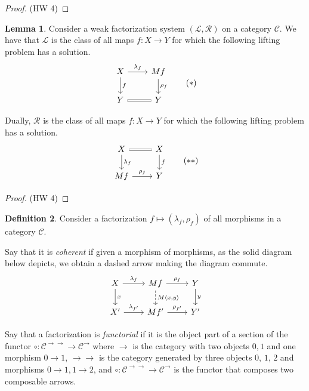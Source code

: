\documentclass{article}
\theoremstyle{definition}
\newtheorem{definition}{Definition}[section]
\newtheorem{lemma}[definition]{Lemma}
\newcommand{\C}{\mathcal C}
\begin{document}
\begin{proof}
    (HW 4)
\end{proof}

\begin{lemma}
    \label{lem:factorization}
    Consider a weak factorization system $(\mathcal L, \mathcal R)$ on a category $\C$. We have that $\mathcal L$ is the class of all maps $f: X \to Y$ for which the following lifting problem has a solution.
    \[
         \begin{tikzcd}
             X \ar[r,"\lambda_f"] \ar[d,"f"] & Mf \ar[d,"\rho_f"]
             \\ 
             Y \ar[r,equal] & Y
         \end{tikzcd}
         \tag{$*$}
    \]

    Dually, $\mathcal R$ is the class of all maps $f: X \to Y$ for which the following lifting problem has a solution.
    \[
         \begin{tikzcd}
             X \ar[r,equal] \ar[d,"\lambda_f"] & X \ar[d,"f"]
             \\ 
             Mf \ar[r,"\rho_f"] & Y
         \end{tikzcd}
         \tag{$**$}
    \]
\end{lemma}
\begin{proof}
    (HW 4)
\end{proof}

\begin{definition}
    Consider a factorization $f \mapsto (\lambda_f, \rho_f)$ of all morphisms in a category $\C$.
    
    Say that it is \emph{coherent} if given a morphism of morphisms, as the solid diagram below depicts, we obtain a dashed arrow making the diagram commute.
    \[
         \begin{tikzcd}
             X \ar[r,"\lambda_f"] \ar[d,"x"] & Mf \ar[d,"{M\langle x , y \rangle}", dashed] \ar[r,"\rho_f"] & Y \ar[d,"y"]
             \\ 
             X' \ar[r,"\lambda_{f'}"] & Mf' \ar[r,"\rho_{f'}"] & Y'
         \end{tikzcd}
    \]

    Say that a factorization is \emph{functorial} if it is the object part of a section of the functor $\circ : \C^{\to \to} \to \C^\to$ where $\to$ is the category with two objects $0,1$ and one morphism $0 \to 1$, $\to \to$ is the category generated by three objects $0$, $1$, $2$ and morphisms $0 \to 1, 1 \to 2$, and $\circ : \C^{\to \to} \to \C^\to$ is the functor that composes two composable arrows.
\end{definition}
\end{document}
